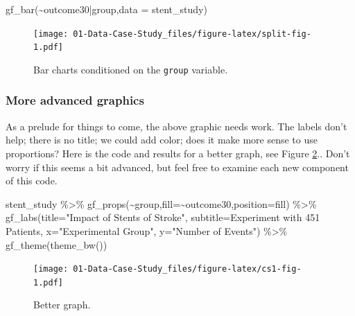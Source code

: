 \documentclass[
]{book}
\newenvironment{Shaded}{\begin{snugshade}}{\end{snugshade}}
\newcommand{\AttributeTok}[1]{\textcolor[rgb]{0.77,0.63,0.00}{#1}}
\newcommand{\FunctionTok}[1]{\textcolor[rgb]{0.00,0.00,0.00}{#1}}
\newcommand{\NormalTok}[1]{#1}
\newcommand{\SpecialCharTok}[1]{\textcolor[rgb]{0.00,0.00,0.00}{#1}}
\newcommand{\StringTok}[1]{\textcolor[rgb]{0.31,0.60,0.02}{#1}}
\begin{document}
\begin{Shaded}
\begin{Highlighting}[]
\FunctionTok{gf\_bar}\NormalTok{(}\SpecialCharTok{\textasciitilde{}}\NormalTok{outcome30}\SpecialCharTok{|}\NormalTok{group,}\AttributeTok{data =}\NormalTok{ stent\_study) }
\end{Highlighting}
\end{Shaded}

\begin{figure}
\centering
\texttt{[image: 01-Data-Case-Study\_files/figure-latex/split-fig-1.pdf]}
\caption{\label{fig:split-fig}Bar charts conditioned on the \texttt{group} variable.}
\end{figure}

\hypertarget{more-advanced-graphics}{%
\subsubsection{More advanced graphics}\label{more-advanced-graphics}}

As a prelude for things to come, the above graphic needs work. The labels don't help; there is no title; we could add color; does it make more sense to use proportions? Here is the code and results for a better graph, see Figure \ref{fig:cs1-fig}.. Don't worry if this seems a bit advanced, but feel free to examine each new component of this code.

\begin{Shaded}
\begin{Highlighting}[]
\NormalTok{stent\_study }\SpecialCharTok{\%\textgreater{}\%}
\FunctionTok{gf\_props}\NormalTok{(}\SpecialCharTok{\textasciitilde{}}\NormalTok{group,}\AttributeTok{fill=}\SpecialCharTok{\textasciitilde{}}\NormalTok{outcome30,}\AttributeTok{position=}\StringTok{\textquotesingle{}fill\textquotesingle{}}\NormalTok{) }\SpecialCharTok{\%\textgreater{}\%}
  \FunctionTok{gf\_labs}\NormalTok{(}\AttributeTok{title=}\StringTok{"Impact of Stents of Stroke"}\NormalTok{,}
          \AttributeTok{subtitle=}\StringTok{\textquotesingle{}Experiment with 451 Patients\textquotesingle{}}\NormalTok{,}
          \AttributeTok{x=}\StringTok{"Experimental Group"}\NormalTok{,}
          \AttributeTok{y=}\StringTok{"Number of Events"}\NormalTok{) }\SpecialCharTok{\%\textgreater{}\%}
  \FunctionTok{gf\_theme}\NormalTok{(}\FunctionTok{theme\_bw}\NormalTok{())}
\end{Highlighting}
\end{Shaded}

\begin{figure}
\centering
\texttt{[image: 01-Data-Case-Study\_files/figure-latex/cs1-fig-1.pdf]}
\caption{\label{fig:cs1-fig}Better graph.}
\end{figure}
\end{document}

